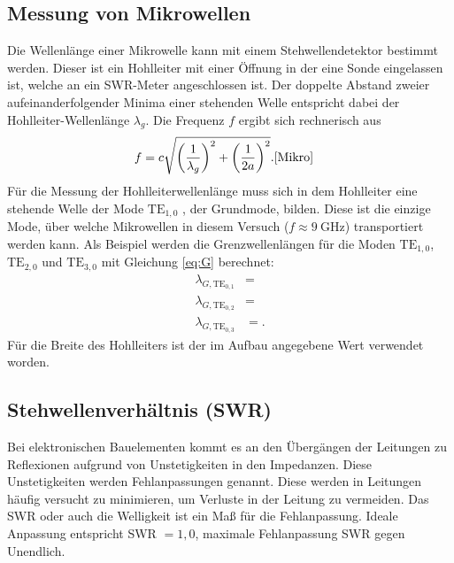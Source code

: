         \subsection{Messung von Mikrowellen}
            Die Wellenlänge einer Mikrowelle kann mit einem Stehwellendetektor bestimmt werden.
            Dieser ist ein Hohlleiter mit einer Öffnung in der eine Sonde eingelassen ist, welche an ein SWR-Meter angeschlossen ist.
            Der doppelte Abstand zweier aufeinanderfolgender Minima einer stehenden Welle entspricht dabei der Hohlleiter-Wellenlänge $\lambda _g$. Die Frequenz $f$
            ergibt sich rechnerisch aus
            \begin{align}
                f &= c \sqrt{\left(\frac{1}{\lambda _g}\right)^2+\left(\frac{1}{2a}\right)^2} \label{eq:1}. \text{\cite{Mikro}}
            \end{align}
            Für die Messung der Hohlleiterwellenlänge muss sich in dem Hohlleiter eine stehende Welle der Mode $\text{TE}_{1,0}$ , der Grundmode, bilden.
            Diese ist die einzige Mode, über welche Mikrowellen in diesem Versuch ($f \approx \SI{9}{\giga\hertz}$) transportiert werden kann.
            Als Beispiel werden die Grenzwellenlängen für die Moden $\text{TE}_{1,0}$, $\text{TE}_{2,0}$ und $\text{TE}_{3,0}$ mit Gleichung \eqref{eq:G} berechnet:
            \begin{align}
                \lambda _{G,\text{TE}_{0,1}} &= \text{} \\
                \lambda _{G,\text{TE}_{0,2}} &= \text{} \\
                \lambda _{G,\text{TE}_{0,3}} &= \text{}.
            \end{align}
            Für die Breite des Hohlleiters ist der im Aufbau angegebene Wert verwendet worden. 


        \subsection{Stehwellenverhältnis (SWR)}
            Bei elektronischen Bauelementen kommt es an den Übergängen der Leitungen zu
            Reflexionen aufgrund von Unstetigkeiten in den Impedanzen. Diese Unstetigkeiten werden Fehlanpassungen genannt.
            Diese werden in Leitungen häufig versucht zu minimieren, um Verluste in der Leitung zu vermeiden.
            Das SWR oder auch die Welligkeit ist ein Maß für die Fehlanpassung. Ideale Anpassung entspricht SWR $= 1,0$, maximale Fehlanpassung SWR gegen Unendlich.
            
